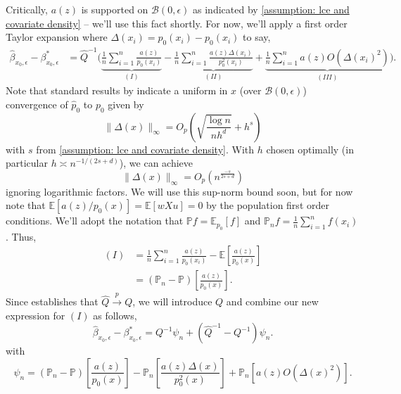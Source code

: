 \documentclass[11pt]{article}
\begin{document}
Critically, $a(z)$ is supported on $\mathcal{B}(0, \epsilon)$ as indicated by \cref{assumption: lce and covariate density} -- we'll use this fact shortly. For now, we'll apply a first order Taylor expansion where $\Delta(x_i) = \hat{p}_0(x_i) - p_0(x_i)$ to say,
\begin{align}
    \hat{\beta}_{x_0, \epsilon} - \beta^*_{x_0, \epsilon} &= \hat{Q}^{-1}\bigg(\underbrace{\frac{1}{n}\sum_{i = 1}^n\frac{a(z)}{p_0(x_i)}}_{(I)} - \underbrace{\frac{1}{n}\sum_{i = 1}^n\frac{a(z)\Delta(x_i)}{p_0^2(x_i)}}_{(II)} + \underbrace{\frac{1}{n}\sum_{i = 1}^na(z) O(\Delta(x_i)^2)}_{(III)}\bigg).
\end{align}
Note that standard results by \citet{hansen2008uniform} indicate a uniform in $x$ (over $\mathcal{B}(0, \epsilon)$)  convergence of $\hat{p}_0$ to $p_0$ given by
\begin{equation}
    \|\Delta(x)\|_{\infty} = O_p\left(\sqrt{\frac{\log n}{nh^d}} + h^s\right)
\end{equation}
with $s$ from \cref{assumption: lce and covariate density}. With $h$ chosen optimally (in particular $h \asymp n^{-1/(2s+d)}$), we can achieve
\begin{equation}
    \|\Delta(x)\|_{\infty} = O_p\left(n^{\frac{-s}{2s+d}}\right)
\end{equation}
ignoring logarithmic factors. We will use this sup-norm bound soon, but for now note that $\mathbb{E}[a(z)/p_0(x)] = \mathbb{E}[wXu] = 0$ by the population first order conditions. We'll adopt the notation that $\mathbb{P}f = \mathbb{E}_{p_0}[f]$ and $\mathbb{P}_nf = \frac{1}{n}\sum_{i = 1}^nf(x_i)$. Thus,
\begin{align}
    (I) &= \frac{1}{n}\sum_{i = 1}^n\frac{a(z)}{p_0(x_i)} - \mathbb{E}\left[\frac{a(z)}{p_0(x)}\right] \\
    &= (\mathbb{P}_n -\mathbb{P})\left[\frac{a(z)}{p_0(x)}\right].
\end{align}
Since  establishes that $\hat{Q} \overset{p}\rightarrow Q$, we will introduce $Q$ and combine our new expression for $(I)$ as follows,
\begin{equation}
    \hat{\beta}_{x_0, \epsilon} - \beta^*_{x_0, \epsilon} = Q^{-1}\psi_n + (\hat{Q}^{-1} - Q^{-1})\psi_n.
\end{equation}
with
\begin{equation}
    \psi_n = (\mathbb{P}_n -\mathbb{P})\left[\frac{a(z)}{p_0(x)}\right] - \mathbb{P}_n\left[\frac{a(z)\Delta(x)}{p^2_0(x)}\right] + \mathbb{P}_n\left[a(z)O\left(\Delta(x)^2\right)\right].
\end{equation}
\end{document}
